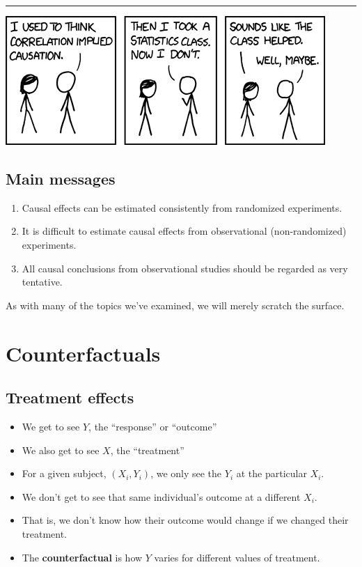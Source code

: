 \documentclass[]{article}
\providecommand{\tightlist}{%
  \setlength{\itemsep}{0pt}\setlength{\parskip}{0pt}}
\begin{document}
\begin{center}\rule{0.5\linewidth}{\linethickness}\end{center}

\begin{center}\includegraphics{gfx/correlation} \end{center}

\hypertarget{main-messages}{%
\subsection{Main messages}\label{main-messages}}

\begin{enumerate}
\def\labelenumi{\arabic{enumi}.}
\tightlist
\item
  Causal effects can be estimated consistently from randomized
  experiments.
\item
  It is difficult to estimate causal effects from observational
  (non-randomized) experiments.
\item
  All causal conclusions from observational studies should be regarded
  as very tentative.
\end{enumerate}

As with many of the topics we've examined, we will merely scratch the
surface.

\hypertarget{counterfactuals}{%
\section{Counterfactuals}\label{counterfactuals}}

\hypertarget{treatment-effects}{%
\subsection{Treatment effects}\label{treatment-effects}}

\begin{itemize}
\tightlist
\item
  We get to see \(Y\), the ``response'' or ``outcome''
\item
  We also get to see \(X\), the ``treatment''
\item
  For a given subject, \((X_i,Y_i)\), we only see the \(Y_i\) at the
  particular \(X_i\).
\item
  We don't get to see that same individual's outcome at a different
  \(X_i\).
\item
  That is, we don't know how their outcome would change if we changed
  their treatment.
\item
  The \textbf{counterfactual} is how \(Y\) varies for different values
  of treatment.
\end{itemize}
\end{document}
